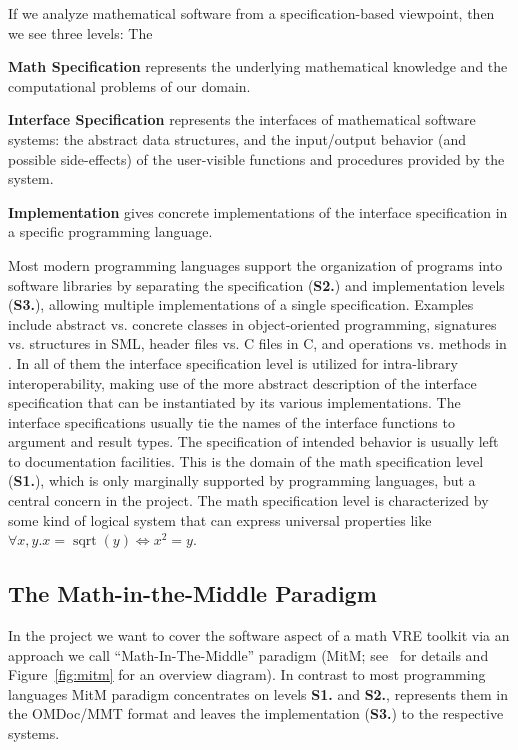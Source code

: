 If we analyze mathematical software from a specification-based viewpoint, then we see
three levels: The
\begin{compactenum}[\rm\bf S1.]
\item \textbf{Math Specification} represents the underlying mathematical knowledge and
  the computational problems of our domain.
\item \textbf{Interface Specification} represents the interfaces of mathematical software
  systems: the abstract data structures, and the input/output behavior (and possible
  side-effects) of the user-visible functions and procedures provided by the system.
\item \textbf{Implementation} gives concrete implementations of the interface
  specification in a specific programming language.
\end{compactenum}
Most modern programming languages support the organization of programs into software
libraries by separating the specification (\textbf{S2.}) and implementation levels
(\textbf{S3.}), allowing multiple implementations of a single specification. Examples include
abstract vs. concrete classes in object-oriented programming, signatures vs. structures in
SML, header files vs. C files in C, and operations vs. methods in \GAP. In all of them the
interface specification level is utilized for intra-library interoperability, making use
of the more abstract description of the interface specification that can be instantiated
by its various implementations. The interface specifications usually tie the names of the
interface functions to argument and result types. The specification of intended behavior
is usually left to documentation facilities. This is the domain of the math specification
level (\textbf{S1.}), which is only marginally supported by programming languages, but a
central concern in the \pn project. The math specification level is characterized by some
kind of logical system that can express universal properties like
$\forall x,y. x=\operatorname{sqrt}(y) \Leftrightarrow x^2=y$.

\subsection{The Math-in-the-Middle Paradigm}

In the \pn project we want to cover the software aspect of a math VRE toolkit via an
approach we call ``Math-In-The-Middle'' paradigm (MitM; see~\cite{DehKohKon:iop16} for
details and Figure~\ref{fig:mitm} for an overview diagram). In contrast to most
programming languages MitM paradigm concentrates on levels \textbf{S1.} and \textbf{S2.},
represents them in the OMDoc/MMT format and leaves the implementation (\textbf{S3.}) to
the respective systems.

